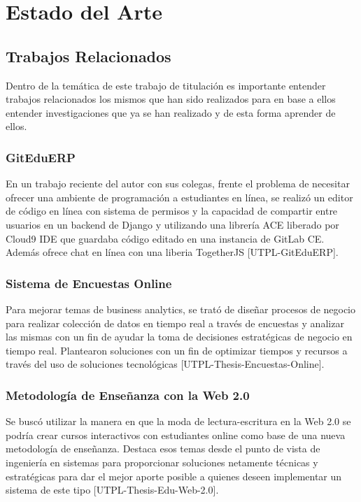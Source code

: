 
\chapter{Estado del Arte}
\label{capitulo2}

\section{Trabajos Relacionados}
Dentro de la temática de este trabajo de titulación es importante entender trabajos relacionados los mismos que han sido realizados para en base a ellos entender investigaciones que ya se han realizado y de esta forma aprender de ellos.

\subsection{GitEduERP}
En un trabajo reciente del autor con sus colegas, frente el problema de necesitar ofrecer una ambiente de programación a estudiantes en línea, se realizó un editor de código en línea con sistema de permisos y la capacidad de compartir entre usuarios en un backend de Django y utilizando una librería ACE liberado por Cloud9 IDE que guardaba código editado en una instancia de GitLab CE. Además ofrece chat en línea con una liberia TogetherJS [UTPL-GitEduERP].

\subsection{Sistema de Encuestas Online}
Para mejorar temas de business analytics, se trató de diseñar procesos de negocio para realizar colección de datos en tiempo real a través de encuestas y analizar las mismas con un fin de ayudar la toma de decisiones estratégicas de negocio en tiempo real. Plantearon soluciones con un fin de optimizar tiempos y recursos a través del uso de soluciones tecnológicas [UTPL-Thesis-Encuestas-Online].

\subsection{Metodología de Enseñanza con la Web 2.0}
Se buscó utilizar la manera en que la moda de lectura-escritura en la Web 2.0 se podría crear cursos interactivos con estudiantes online como base de una nueva metodología de enseñanza. Destaca esos temas desde el punto de vista de ingeniería en sistemas para proporcionar soluciones netamente técnicas y estratégicas para dar el mejor aporte posible a quienes deseen implementar un sistema de este tipo [UTPL-Thesis-Edu-Web-2.0].

